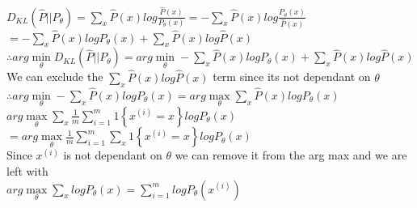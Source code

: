 \begin{answer}\\
$D_{KL}(\hat{P}||P_{\theta})=\sum_{x}\hat{P}(x)log \frac{\hat{P}(x)}{P_{\theta}(x)}=-\sum_{x}\hat{P}(x)log \frac{P_{\theta}(x)}{\hat{P}(x)}$\\
$=-\sum_{x}\hat{P}(x)log P_{\theta}(x)+\sum_{x}\hat{P}(x)log \hat{P}(x)$\\
$\therefore arg \min\limits_{\theta} D_{KL}(\hat{P}||P_{\theta})=arg \min\limits_{\theta}-\sum_{x}\hat{P}(x)log P_{\theta}(x)+\sum_{x}\hat{P}(x)log \hat{P}(x)$\\
We can exclude the $\sum_{x}\hat{P}(x)log \hat{P}(x)$ term since its not dependant on $\theta$\\
$\therefore arg \min\limits_{\theta}-\sum_{x}\hat{P}(x)log P_{\theta}(x)=arg \max\limits_{\theta} \sum_{x}\hat{P}(x)log P_{\theta}(x)$\\
$arg \max\limits_{\theta} \sum_{x} \frac{1}{m}\sum_{i=1}^{m}1 \left \lbrace x^{(i)}=x \right \rbrace log P_{\theta}(x)$\\
$=arg \max\limits_{\theta} \frac{1}{m}\sum_{i=1}^{m} \sum_{x} 1 \left \lbrace x^{(i)}=x \right \rbrace log P_{\theta}(x)$\\
Since $x^{(i)}$ is not dependant on $\theta$ we can remove it from the arg max and we are left with\\
$arg \max\limits_{\theta} \sum_x log P_{\theta}(x)=\sum_{i=1}^{m} log P_{\theta}(x^{(i)})$\\
\end{answer}

